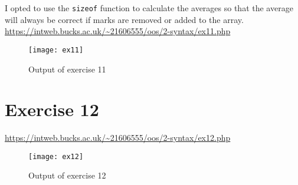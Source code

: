 I opted to use the \texttt{sizeof} function to calculate the averages so that the average will always be correct if marks are removed or added to the array.\\

\url{https://intweb.bucks.ac.uk/~21606555/oos/2-syntax/ex11.php}
\captionsetup{type=figure}


\begin{figure}[H]
  \caption{Output of exercise 11}
  \centering
  \texttt{[image: ex11]}
\end{figure}

\clearpage
\section{Exercise 12}

\url{https://intweb.bucks.ac.uk/~21606555/oos/2-syntax/ex12.php}
\captionsetup{type=figure}


\begin{figure}[H]
  \caption{Output of exercise 12}
  \centering
  \texttt{[image: ex12]}
\end{figure}
